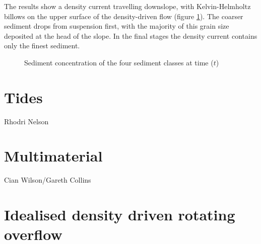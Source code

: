 The results show a density current travelling downslope, with Kelvin-Helmholtz billows
on the upper surface of the density-driven flow (figure \ref{fig:sediment_concentration}). 
The coarser sediment drops from suspension first, with the majority of this
grain size deposited at the head of the slope. In the final stages the density current contains
only the finest sediment.
\begin{figure}[ht]
  \centering
  \caption{Sediment concentration of the four sediment classes at time ($t$)}
  \label{fig:sediment_concentration}
\end{figure}





\section{Tides}
\label{sect:tides}

Rhodri Nelson


\section{Multimaterial}
\label{sect:multimaterial}

Cian Wilson/Gareth Collins





\section{Idealised density driven rotating overflow}
\label{sect:DOME}
